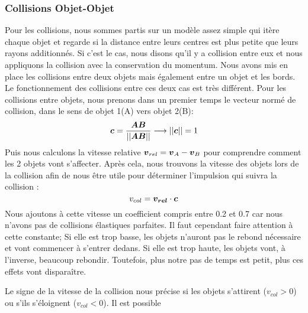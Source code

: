         \subsubsection{Collisions Objet-Objet}
            Pour les collisions, nous sommes partis sur un modèle assez simple qui itère chaque objet et regarde si la distance entre leurs centres est plus petite que leurs rayons additionnés. Si c'est le cas, nous disons qu'il y a collision entre eux et nous appliquons la collision avec la conservation du momentum. 
            Nous avons mis en place les collisions entre deux objets mais également entre un objet et les bords. Le fonctionnement des collisions entre ces deux cas est très différent. Pour les collisions entre objets, nous prenons dans un premier temps le vecteur normé de collision, dans le sens de objet 1(A) vers objet 2(B):
            \begin{equation}
                \vb*{c} = \frac{\vb*{AB}}{||\vb*{AB}||} \longrightarrow ||\vb*{c}|| = 1
            \end{equation}
            Puis nous calculons la vitesse relative $\vb*{v}_{rel} = \vb*{v}_A - \vb*{v}_B$ pour comprendre comment les 2 objets vont s'affecter. Après cela, nous trouvons la vitesse des objets lors de la collision afin de nous être utile pour déterminer l'impulsion qui suivra la collision :
            \begin{equation}
                v_{col}=\vb*{v_{rel}}\cdot\vb*{c}
            \end{equation}
            Nous ajoutons à cette vitesse un coefficient compris entre 0.2 et 0.7 car nous n'avons pas de collisions élastiques parfaites. Il faut cependant faire attention à cette constante; Si elle est trop basse, les objets n'auront pas le rebond nécessaire et vont commencer à s'entrer dedans. Si elle est trop haute, les objets vont, à l'inverse, beaucoup rebondir. Toutefois, plus notre pas de temps est petit, plus ces effets vont disparaître.
            
            Le signe de la vitesse de la collision nous précise si les objets s'attirent ($v_{col} > 0$) ou s'ils s'éloignent ($v_{col} < 0$). Il est possible
            
